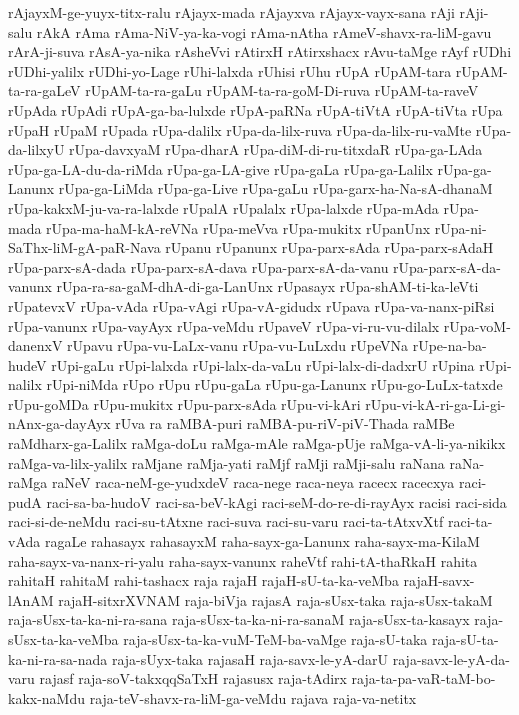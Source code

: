 {rAjayxM-ge-yuyx-titx-ralu
rAjayx-mada
rAjayxva
rAjayx-vayx-sana
rAji
rAji-salu
rAkA
rAma
rAma-NiV-ya-ka-vogi
rAma-nAtha
rAmeV-shavx-ra-liM-gavu
rArA-ji-suva
rAsA-ya-nika
rAsheVvi
rAtirxH
rAtirxshacx
rAvu-taMge
rAyf
rUDhi
rUDhi-yalilx
rUDhi-yo-Lage
rUhi-lalxda
rUhisi
rUhu
rUpA
rUpAM-tara
rUpAM-ta-ra-gaLeV
rUpAM-ta-ra-gaLu
rUpAM-ta-ra-goM-Di-ruva
rUpAM-ta-raveV
rUpAda
rUpAdi
rUpA-ga-ba-lulxde
rUpA-paRNa
rUpA-tiVtA
rUpA-tiVta
rUpa
rUpaH
rUpaM
rUpada
rUpa-dalilx
rUpa-da-lilx-ruva
rUpa-da-lilx-ru-vaMte
rUpa-da-lilxyU
rUpa-davxyaM
rUpa-dharA
rUpa-diM-di-ru-titxdaR
rUpa-ga-LAda
rUpa-ga-LA-du-da-riMda
rUpa-ga-LA-give
rUpa-gaLa
rUpa-ga-Lalilx
rUpa-ga-Lanunx
rUpa-ga-LiMda
rUpa-ga-Live
rUpa-gaLu
rUpa-garx-ha-Na-sA-dhanaM
rUpa-kakxM-ju-va-ra-lalxde
rUpalA
rUpalalx
rUpa-lalxde
rUpa-mAda
rUpa-mada
rUpa-ma-haM-kA-reVNa
rUpa-meVva
rUpa-mukitx
rUpanUnx
rUpa-ni-SaThx-liM-gA-paR-Nava
rUpanu
rUpanunx
rUpa-parx-sAda
rUpa-parx-sAdaH
rUpa-parx-sA-dada
rUpa-parx-sA-dava
rUpa-parx-sA-da-vanu
rUpa-parx-sA-da-vanunx
rUpa-ra-sa-gaM-dhA-di-ga-LanUnx
rUpasayx
rUpa-shAM-ti-ka-leVti
rUpatevxV
rUpa-vAda
rUpa-vAgi
rUpa-vA-gidudx
rUpava
rUpa-va-nanx-piRsi
rUpa-vanunx
rUpa-vayAyx
rUpa-veMdu
rUpaveV
rUpa-vi-ru-vu-dilalx
rUpa-voM-danenxV
rUpavu
rUpa-vu-LaLx-vanu
rUpa-vu-LuLxdu
rUpeVNa
rUpe-na-ba-hudeV
rUpi-gaLu
rUpi-lalxda
rUpi-lalx-da-vaLu
rUpi-lalx-di-dadxrU
rUpina
rUpi-nalilx
rUpi-niMda
rUpo
rUpu
rUpu-gaLa
rUpu-ga-Lanunx
rUpu-go-LuLx-tatxde
rUpu-goMDa
rUpu-mukitx
rUpu-parx-sAda
rUpu-vi-kAri
rUpu-vi-kA-ri-ga-Li-gi-nAnx-ga-dayAyx
rUva
ra
raMBA-puri
raMBA-pu-riV-piV-Thada
raMBe
raMdharx-ga-Lalilx
raMga-doLu
raMga-mAle
raMga-pUje
raMga-vA-li-ya-nikikx
raMga-va-lilx-yalilx
raMjane
raMja-yati
raMjf
raMji
raMji-salu
raNana
raNa-raMga
raNeV
raca-neM-ge-yudxdeV
raca-nege
raca-neya
racecx
racecxya
raci-pudA
raci-sa-ba-hudoV
raci-sa-beV-kAgi
raci-seM-do-re-di-rayAyx
racisi
raci-sida
raci-si-de-neMdu
raci-su-tAtxne
raci-suva
raci-su-varu
raci-ta-tAtxvXtf
raci-ta-vAda
ragaLe
rahasayx
rahasayxM
raha-sayx-ga-Lanunx
raha-sayx-ma-KilaM
raha-sayx-va-nanx-ri-yalu
raha-sayx-vanunx
raheVtf
rahi-tA-thaRkaH
rahita
rahitaH
rahitaM
rahi-tashacx
raja
rajaH
rajaH-sU-ta-ka-veMba
rajaH-savx-lAnAM
rajaH-sitxrXVNAM
raja-biVja
rajasA
raja-sUsx-taka
raja-sUsx-takaM
raja-sUsx-ta-ka-ni-ra-sana
raja-sUsx-ta-ka-ni-ra-sanaM
raja-sUsx-ta-kasayx
raja-sUsx-ta-ka-veMba
raja-sUsx-ta-ka-vuM-TeM-ba-vaMge
raja-sU-taka
raja-sU-ta-ka-ni-ra-sa-nada
raja-sUyx-taka
rajasaH
raja-savx-le-yA-darU
raja-savx-le-yA-da-varu
rajasf
raja-soV-takxqqSaTxH
rajasusx
raja-tAdirx
raja-ta-pa-vaR-taM-bo-kakx-naMdu
raja-teV-shavx-ra-liM-ga-veMdu
rajava
raja-va-netitx
}
